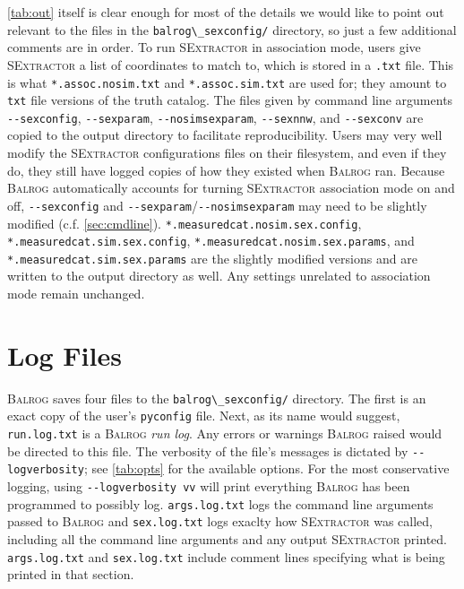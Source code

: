 \documentclass[11pt]{book}
\newcommand{\codett}[1]{\lstinline{#1}}
\newcommand{\pyconfig}{\codett{pyconfig}}
\newcommand{\balrog}{\textsc{Balrog}}
\newcommand{\sex}{\textsc{SExtractor}}
\newcommand{\opt}[1]{\codett{--#1}}
\begin{document}
\autoref{tab:out} itself is clear enough for most of the details we would like to point out relevant to
the files in the \codett{balrog\_sexconfig/} directory, so just a few additional comments are in order.
To run \sex{} in association mode, users give \sex{} a list of coordinates to match to, which is stored in a \codett{.txt} file.
This is what \codett{*.assoc.nosim.txt} and \codett{*.assoc.sim.txt} are used for;
they amount to \codett{txt} file versions of the truth catalog.
The files given by command line arguments \opt{sexconfig}, \opt{sexparam}, \opt{nosimsexparam}, \opt{sexnnw}, and \opt{sexconv}
are copied to the output directory to facilitate reproducibility. Users may very well modify 
the \sex{} configurations files on their filesystem, and even if they do, they still have logged copies of how they existed when \balrog{} ran.
Because \balrog{} automatically accounts for turning \sex{} association mode on and off, 
\opt{sexconfig} and \opt{sexparam}/\opt{nosimsexparam} may need to be slightly modified
(c.f. \autoref{sec:cmdline}).
\codett{*.measuredcat.nosim.sex.config}, \codett{*.measuredcat.sim.sex.config}, \codett{*.measuredcat.nosim.sex.params}, 
and \codett{*.measuredcat.sim.sex.params} 
are the slightly modified versions and are written to the output directory as well.
Any settings unrelated to association mode remain unchanged.


\section{Log Files}
\label{sec:logs}

\balrog{} saves four files to the \codett{balrog\_sexconfig/} directory.
The first is an exact copy of the user's \pyconfig{} file.
Next, as its name would suggest, \codett{run.log.txt} is a \balrog{} \emph{run log}.
Any errors or warnings \balrog{} raised would be directed to this file.
The verbosity of the file's messages is dictated by \opt{logverbosity}; see \autoref{tab:opts}
for the available options. For the most conservative logging, 
using \opt{logverbosity vv} will print everything \balrog{} has been programmed 
to possibly log.
\codett{args.log.txt} logs the command line arguments passed to \balrog{}
and \codett{sex.log.txt} logs exaclty how \sex{} was called, including all the command line arguments and any output \sex{} printed.
\codett{args.log.txt} and \codett{sex.log.txt} include comment lines specifying 
what is being printed in that section.
\end{document}
